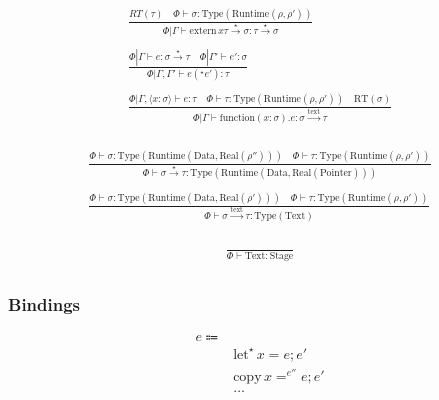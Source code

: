 \documentclass {article}
\begin{document}
\begin{gather*}
\frac
{RT(\tau) \quad \Phi \vdash \sigma : \text{Type}(\text{Runtime} (\rho, \rho'))}
{\Phi | \Gamma \vdash \text{extern} \, x \tau \xrightarrow{\star} \sigma : \tau \xrightarrow{\star} \sigma} \\
\\
\frac
{\Phi | \Gamma \vdash e : \sigma \xrightarrow{\star} \tau \quad \Phi | \Gamma' \vdash e' : \sigma}
{\Phi | \Gamma, \Gamma' \vdash e(^\star e') : \tau} \\
\\
\frac
{\Phi | \Gamma, \langle x : \sigma \rangle \vdash e : \tau \quad \Phi \vdash \tau : \text{Type}(\text{Runtime}(\rho, \rho')) \quad \text{RT}(\sigma)}
{\Phi | \Gamma \vdash \text{function}(x : \sigma). e : \sigma \xrightarrow{\text{text}} \tau} \\
\end{gather*}

\begin{gather*}
\frac
{\Phi \vdash \sigma : \text{Type} (\text{Runtime} (\text{Data}, \text{Real} (\rho''))) \quad \Phi \vdash \tau : \text{Type} (\text{Runtime} (\rho, \rho'))}
{\Phi \vdash \sigma \xrightarrow{\star} \tau : \text{Type} (\text{Runtime} (\text{Data}, \text{Real} ( \text{Pointer})))} \\
\\
\frac
{\Phi \vdash \sigma : \text{Type} (\text{Runtime} (\text{Data}, \text{Real}( \rho' ))) \quad \Phi \vdash \tau : \text{Type} (\text{Runtime} (\rho, \rho'))}
{\Phi \vdash \sigma \xrightarrow{\text{text}} \tau : \text{Type} (\text{Text})} \\
\end{gather*}


\begin{gather*}
\frac
{}
{\Phi \vdash \text{Text} : \text{Stage}} \\
\end{gather*}

\subsubsection{Bindings}
\begin{align*}
e \Coloneqq & \\
& \text{let}^\star \, x = e; e' \tag{Runtime Let} \\
& \text{copy} \, x =^{e''} e; e' \tag{Runtime Copy Let} \\
& \dots
\end{align*}
\end{document}
